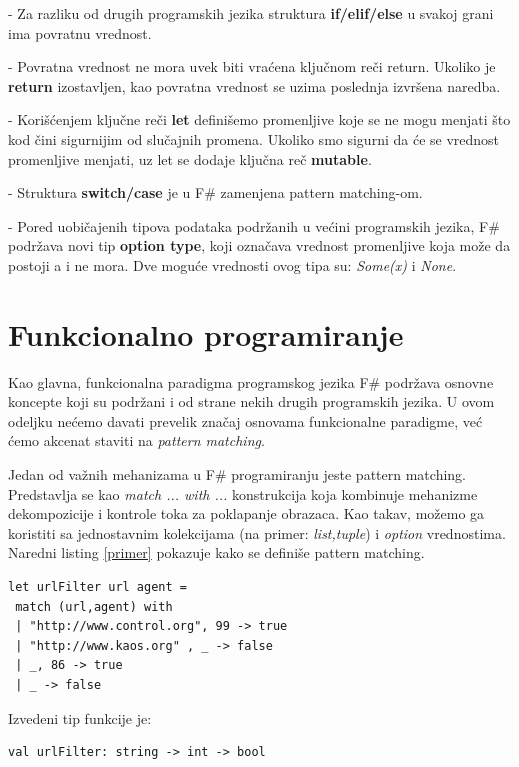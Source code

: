 \documentclass[a4paper]{article}
\begin{document}
	- Za razliku od drugih programskih jezika struktura \textbf{if/elif/else} u svakoj grani ima povratnu vrednost.
	 
	- Povratna vrednost ne mora uvek biti vraćena ključnom reči return. Ukoliko je \textbf{return} izostavljen, kao povratna vrednost se uzima poslednja izvršena naredba.
	 
	- Korišćenjem ključne reči \textbf{let} definišemo promenljive koje se ne mogu menjati što kod čini sigurnijim od slučajnih promena. Ukoliko smo sigurni da će se vrednost promenljive menjati, uz let se dodaje ključna reč \textbf{mutable}.
	 
	- Struktura \textbf{switch/case} je u F\# zamenjena pattern matching-om\cite{expertFS}.
	 
	- Pored uobičajenih tipova podataka podržanih u većini programskih jezika, F\# podržava novi tip \textbf{option type}, koji označava vrednost promenljive koja može da postoji a i ne mora. Dve moguće vrednosti ovog tipa su: {\em Some(x)} i {\em None}.

\section{Funkcionalno programiranje}


Kao glavna, funkcionalna paradigma programskog jezika F\# podržava osnovne koncepte koji su podržani i od strane nekih drugih programskih jezika. U ovom odeljku nećemo davati prevelik značaj osnovama funkcionalne paradigme, već ćemo akcenat staviti na {\em pattern matching}\cite{expertFS}.

Jedan od važnih mehanizama u F\# programiranju jeste pattern matching. Predstavlja se kao {\em match ... with ...} konstrukcija koja kombinuje mehanizme dekompozicije i kontrole toka za poklapanje obrazaca. Kao takav, možemo ga koristiti sa  jednostavnim kolekcijama (na primer: {\em list,tuple}) i {\em option} vrednostima. Naredni listing \ref{primer} pokazuje kako se definiše pattern matching.
\\
\begin{lstlisting}[caption={Primer pattern matching-a\cite{expertFS}},frame=single, label=primer]
let urlFilter url agent =
 match (url,agent) with
 | "http://www.control.org", 99 -> true
 | "http://www.kaos.org" , _ -> false
 | _, 86 -> true
 | _ -> false
\end{lstlisting} 

Izvedeni tip funkcije je:

\begin{lstlisting}
val urlFilter: string -> int -> bool
\end{lstlisting}
\end{document}

